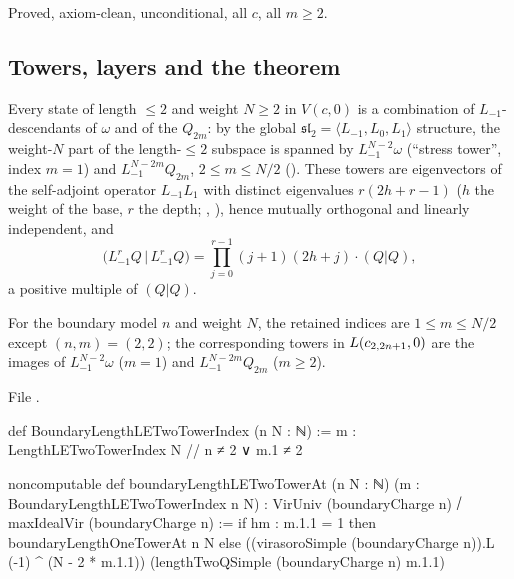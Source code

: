 \begin{status}
Proved, axiom-clean, unconditional, all $c$, all $m\ge2$.
\end{status}

\subsection{Towers, layers and the theorem}

Every state of length $\le2$ and weight $N\ge2$ in $V(c,0)$ is a combination of $L_{-1}$-descendants of
$\omega$ and of the $Q_{2m}$: by the global $\mathfrak{sl}_2 = \langle L_{-1},L_0,L_1\rangle$ structure,
the weight-$N$ part of the length-$\le2$ subspace is spanned by
$L_{-1}^{N-2}\omega$ (``stress tower'', index $m=1$) and $L_{-1}^{N-2m}Q_{2m}$, $2\le m\le N/2$
(). These towers are eigenvectors of the self-adjoint operator
$L_{-1}L_1$ with distinct eigenvalues $r(2h+r-1)$ ($h$ the weight of the base, $r$ the depth;
, \allowbreak{}), hence mutually orthogonal and
linearly independent, and
\begin{equation*}
 \big(L_{-1}^rQ\,\big|\,L_{-1}^rQ\big) = \prod_{j=0}^{r-1}(j+1)(2h+j)\cdot(Q|Q),
\end{equation*}
a positive multiple of $(Q|Q)$.

\begin{definition}\label{l19:def:towers}
For the boundary model $n$ and weight $N$, the retained indices are $1\le m\le N/2$ except $(n,m) =
(2,2)$; the corresponding towers in $L(c_{2,2n+1},0)$ are the images of $L_{-1}^{N-2}\omega$ ($m=1$) and
$L_{-1}^{N-2m}Q_{2m}$ ($m\ge2$).
\end{definition}

\noindent File .
\begin{leancode}
def BoundaryLengthLETwoTowerIndex (n N : ℕ) :=
  {m : LengthLETwoTowerIndex N // n ≠ 2 ∨ m.1 ≠ 2}

noncomputable def boundaryLengthLETwoTowerAt (n N : ℕ)
    (m : BoundaryLengthLETwoTowerIndex n N) :
    VirUniv (boundaryCharge n) ⧸ maxIdealVir (boundaryCharge n) :=
  if hm : m.1.1 = 1 then boundaryLengthOneTowerAt n N
  else ((virasoroSimple (boundaryCharge n)).L (-1) ^ (N - 2 * m.1.1))
    (lengthTwoQSimple (boundaryCharge n) m.1.1)
\end{leancode}

